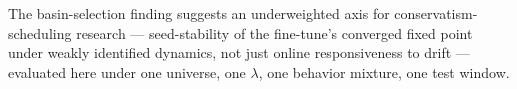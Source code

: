 The basin-selection finding suggests an underweighted axis for
conservatism-scheduling research --- seed-stability of the fine-tune's
converged fixed point under weakly identified dynamics, not just
online responsiveness to drift --- evaluated here under one universe,
one $\lambda$, one behavior mixture, one test window.
